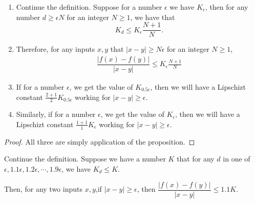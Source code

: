 \documentclass{llncs}
\begin{document}
\begin{corollary}
	\begin{enumerate}
		\item Continue the definition. Suppose for a number $\epsilon$ we have $K_\epsilon$, then for any number $d\geq \epsilon N$ for an integer $N \geq 1$, we have that $$K_d \leq K_\epsilon\frac{N+1}{N}.$$ 
		
		\item Therefore, for any inputs $x,y$ that $|x-y|\geq N\epsilon$ for an integer $N\geq 1$, \begin{align*}
			\dfrac{|f(x)-f(y)|}{|x-y|}\leq K_\epsilon\frac{N+1}{N}
		\end{align*}
		
		\item 	If for a number $\epsilon$, we get the value of $K_{0.5 \epsilon}$, then we will have a Lipschizt constant $\frac{2+1}{2}K_{0.5 \epsilon}$ working for $|x-y|\geq\epsilon$.
		
		
		\item 	Similarly, if for a number $\epsilon$, we get the value of $K_{\epsilon}$, then we will have a Lipschizt constant $\frac{1+1}{1}K_{\epsilon}$ working for $|x-y|\geq\epsilon$.
	\end{enumerate}
\end{corollary}

\begin{proof}
	All three are simply application of the proposition.
\end{proof}

\begin{proposition}
	Continue the definition. Suppose we have a number $K$ that for any $d$ in one of $\epsilon, 1.1\epsilon, 1.2\epsilon, \cdots, 1.9\epsilon$, we have $K_d\leq K$.
	
	Then, for any two inputs $x,y$,if $|x-y|\geq \epsilon$, then $\dfrac{|f(x)-f(y)|}{|x-y|}\leq 1.1 K$. 
\end{proposition}
\end{document}
